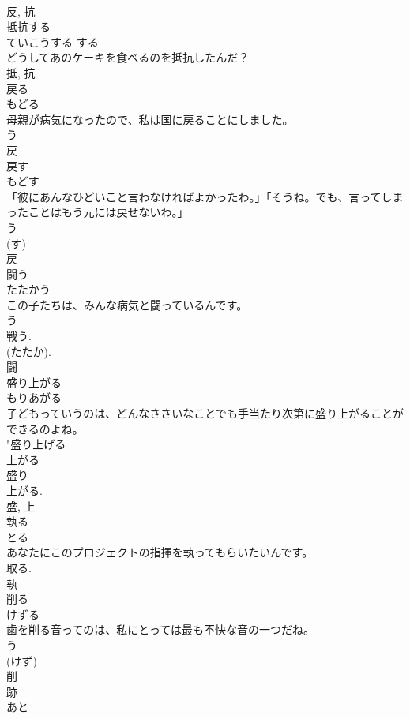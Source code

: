 \documentclass[8pt]{extreport}
\begin{document}
\begin{CJK}{UTF8}{min}
\\	反, 抗	
\\	抵抗する	
\\	ていこうする	する 
\\	どうしてあのケーキを食べるのを抵抗したんだ？	
\\	抵, 抗	
\\	戻る	
\\	もどる	
\\	母親が病気になったので、私は国に戻ることにしました。	
\\	う 
\\	戻	
\\	戻す	
\\	もどす	
\\	「彼にあんなひどいこと言わなければよかったわ。」「そうね。でも、言ってしまったことはもう元には戻せないわ。」	
\\	う 
\\	(す) 
\\	戻	
\\	闘う	
\\	たたかう	
\\	この子たちは、みんな病気と闘っているんです。	
\\	う 
\\	戦う.
\\	(たたか). 
\\	闘	
\\	盛り上がる	
\\	もりあがる	
\\	子どもっていうのは、どんなささいなことでも手当たり次第に盛り上がることができるのよね。	
\\	"盛り上げる 
\\	上がる 
\\	盛り 
\\	上がる. 
\\	盛, 上	
\\	執る	
\\	とる	
\\	あなたにこのプロジェクトの指揮を執ってもらいたいんです。	
\\	取る. 
\\	執	
\\	削る	
\\	けずる	
\\	歯を削る音ってのは、私にとっては最も不快な音の一つだね。	
\\	う 
\\	(けず) 
\\	削	
\\	跡	
\\	あと	

\end{CJK}
\end{document}
